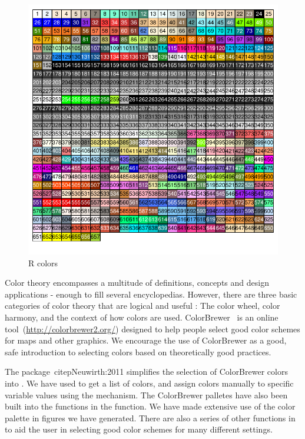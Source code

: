 \documentclass[nojss]{jss}\usepackage[]{graphicx}\usepackage[]{color}
\makeatletter
\def\maxwidth{ %
  \ifdim\Gin@nat@width>\linewidth
    \linewidth
  \else
    \Gin@nat@width
  \fi
}
\newenvironment{knitrout}{}{} %
\makeatother
\begin{document}
\begin{knitrout}\footnotesize
{}\color{fgcolor}\begin{figure}[htpb]


{\centering \includegraphics[width=\maxwidth]{figure/beamer-colorChart} 

}

\caption[R colors]{R colors\label{F:colorChart}}
\end{figure}


\end{knitrout}

Color theory encompasses a multitude of definitions, concepts and design applications - enough to fill several encyclopedias. However, there are three basic categories of color theory that are logical and useful : The color wheel, color harmony, and the context of how colors are used. ColorBrewer~\citep{Brewer:2003} is an online tool~(\url{http://colorbrewer2.org/}) designed to help people select good color schemes for maps and other graphics. We encourage the use of ColorBrewer as a good, safe introduction to selecting colors based on theoretically good practices. 

The  package~citep{Neuwirth:2011} simplifies the selection of ColorBrewer colors into . We have used  to get a list of colors, and assign colors manually to specific variable values using the   mechanism. The ColorBrewer palletes have also been built into the   functions in the  function. We have made extensive use of the  color palette in figures we have generated. There are also a series of other  functions in  to aid the user in selecting good color schemes for many different settings.
\end{document}
